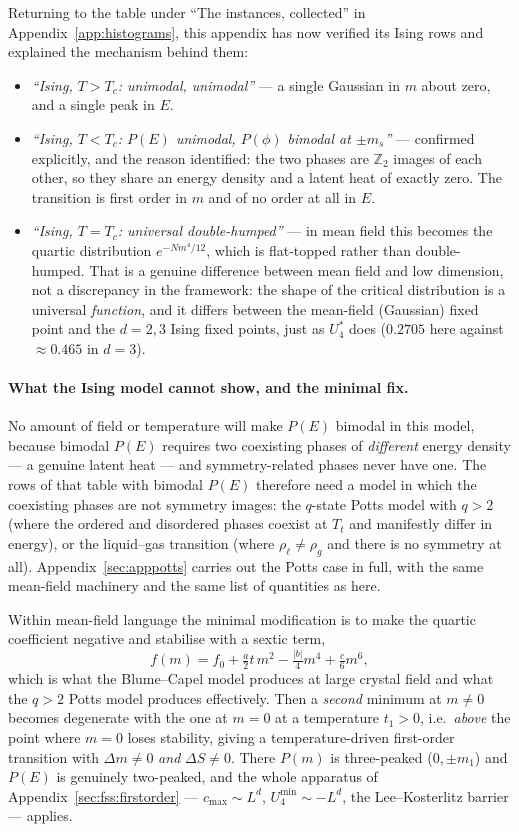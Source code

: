 \documentclass[10pt,a4paper]{article}
\theoremstyle{remark}
\begin{document}
Returning to the table under ``The instances, collected'' in
Appendix~\ref{app:histograms}, this appendix has now verified its Ising rows and
explained the mechanism behind them:

\begin{itemize}
\item \emph{``Ising, $T>T_c$: unimodal, unimodal''} --- a single Gaussian in $m$
about zero, and a single peak in $E$.
\item \emph{``Ising, $T<T_c$: $P(E)$ unimodal, $P(\phi)$ bimodal at $\pm m_s$''}
--- confirmed explicitly, and the reason identified: the two phases are
$\mathbb{Z}_2$ images of each other, so they share an energy density and a
latent heat of exactly zero. The transition is first order in $m$ and of no order
at all in $E$.
\item \emph{``Ising, $T=T_c$: universal double-humped''} --- in mean field this
becomes the quartic distribution $e^{-Nm^{4}/12}$, which is flat-topped rather
than double-humped. That is a genuine difference between mean field and low
dimension, not a discrepancy in the framework: the shape of the critical
distribution is a universal \emph{function}, and it differs between the
mean-field (Gaussian) fixed point and the $d=2,3$ Ising fixed points, just as
$U_4^{\ast}$ does ($0.2705$ here against $\approx0.465$ in $d=3$).
\end{itemize}

\paragraph{What the Ising model cannot show, and the minimal fix.} No amount of
field or temperature will make $P(E)$ bimodal in this model, because bimodal
$P(E)$ requires two coexisting phases of \emph{different} energy density --- a
genuine latent heat --- and symmetry-related phases never have one. The rows of
that table with bimodal $P(E)$ therefore need a model in which the coexisting
phases are not symmetry images: the $q$-state Potts model with $q>2$ (where the
ordered and disordered phases coexist at $T_t$ and manifestly differ in energy),
or the liquid--gas transition (where $\rho_\ell\neq\rho_g$ and there is no symmetry
at all). Appendix~\ref{sec:apppotts} carries out the Potts case in full, with the
same mean-field machinery and the same list of quantities as here.

Within mean-field language the minimal modification is to make the quartic
coefficient negative and stabilise with a sextic term,
\[
f(m)=f_0+\tfrac{a}{2}t\,m^{2}-\tfrac{|b|}{4}m^{4}+\tfrac{c}{6}m^{6} ,
\]
which is what the Blume--Capel model produces at large crystal field and what the
$q>2$ Potts model produces effectively. Then a \emph{second} minimum at $m\neq0$
becomes degenerate with the one at $m=0$ at a temperature $t_1>0$, i.e.\
\emph{above} the point where $m=0$ loses stability, giving a temperature-driven
first-order transition with $\Delta m\neq0$ \emph{and} $\Delta S\neq0$. There
$P(m)$ is three-peaked ($0,\pm m_1$) and $P(E)$ is genuinely two-peaked, and the
whole apparatus of Appendix~\ref{sec:fss:firstorder} --- $c_{\max}\sim L^{d}$,
$U_4^{\min}\sim-L^{d}$, the Lee--Kosterlitz barrier --- applies.
\end{document}
